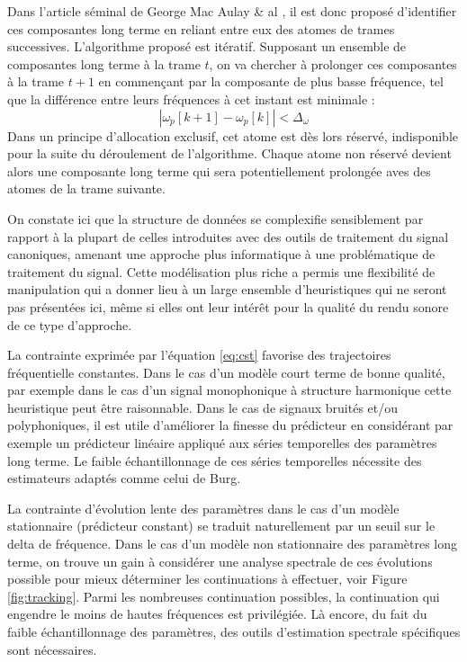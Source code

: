 Dans l'article séminal de George Mac Aulay \& al \cite{mcaulay}, il est donc proposé \og d'identifier \fg ces composantes long terme en reliant entre eux des atomes de trames successives. L'algorithme proposé est itératif. Supposant un ensemble de composantes long terme à la trame $t$, on va chercher à prolonger ces composantes à la trame $t+1$ en commençant par la composante de plus basse fréquence, tel que la différence entre leurs fréquences à cet instant est minimale :
\begin{equation}
\left|\omega_{p}[k+1]-\omega_{p}[k]\right|<\Delta_{\omega}
\label{eq:cst}
\end{equation}
Dans un principe d'allocation exclusif, cet atome est dès lors réservé, indisponible pour la suite du déroulement de l'algorithme. Chaque atome non réservé devient alors une composante long terme qui sera potentiellement prolongée aves des atomes de la trame suivante.

On constate ici que la structure de données se complexifie sensiblement par rapport à la plupart de celles introduites avec des outils de traitement du signal canoniques, amenant une approche plus \og informatique \fg à une problématique de traitement du signal. Cette modélisation plus \og riche \fg a permis une flexibilité de manipulation qui a donner lieu à un large ensemble d'heuristiques qui ne seront pas présentées ici, même si elles ont leur intérêt pour la qualité du rendu sonore de ce type d'approche.

La contrainte exprimée par l'équation \ref{eq:cst} favorise des trajectoires fréquentielle constantes. Dans le cas d'un modèle court terme de bonne qualité, par exemple dans le cas d'un signal monophonique à structure harmonique cette heuristique peut être raisonnable. Dans le cas de signaux bruités et/ou polyphoniques, il est utile d'améliorer la finesse du prédicteur en considérant par exemple un prédicteur linéaire appliqué aux séries temporelles des paramètres long terme. Le faible échantillonnage de ces séries temporelles nécessite des estimateurs adaptés comme celui de Burg\cite{burg1968new}.

La contrainte d'évolution lente des paramètres dans le cas d'un modèle stationnaire (prédicteur constant) se traduit naturellement par un seuil sur le delta de fréquence. Dans le cas d'un modèle non stationnaire des paramètres long terme, on trouve un gain à considérer une analyse spectrale de ces évolutions possible pour mieux déterminer les continuations à effectuer, voir Figure \ref{fig:tracking}. Parmi les nombreuses continuation possibles, la continuation qui engendre le moins de hautes fréquences est privilégiée. Là encore, du fait du faible échantillonnage des paramètres, des outils d'estimation spectrale spécifiques sont nécessaires.

